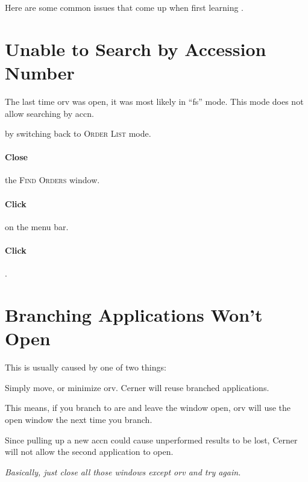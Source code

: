 Here are some common issues that come up when first learning .

\section{Unable to Search by Accession Number}
The last time \gls{orv} was open, it was most likely in ``\gls{fs}'' mode. This mode does not allow searching by \gls{accn}.

 by switching back to \textsc{Order List} mode.
\paragraph{Close} the \textsc{Find Orders} window.
\paragraph{Click}  on the menu bar.
\paragraph{Click} .

\section{Branching Applications Won't Open}
This is usually caused by one of two things:
\begin{description}
     Simply move, or minimize \gls{orv}.
     Cerner will reuse branched applications.

    This means, if you branch to \gls{are} and leave the window open, \gls{orv} will use the open window the next time you branch.

    Since pulling up a new \gls{accn} could cause unperformed results to be lost, Cerner will not allow the second application to open.

    \textit{Basically, just close all those windows except \gls{orv} and try again.}
\end{description}
